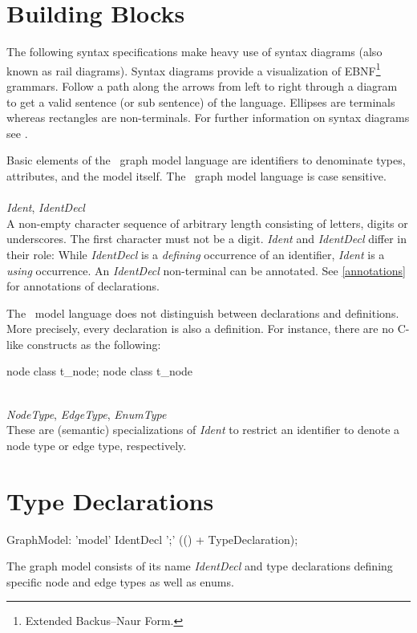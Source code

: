 \section{Building Blocks}
\label{modelbb}

\begin{note}
The following syntax specifications make heavy use of syntax diagrams (also known as rail diagrams). Syntax diagrams provide a visualization of EBNF\footnote{Extended Backus–Naur Form.} grammars. Follow a path along the arrows from left to right through a diagram to get a valid sentence (or sub sentence) of the language. Ellipses are terminals whereas rectangles are non-terminals. For further information on syntax diagrams see \cite{pascal}.
\end{note}
Basic elements of the \GrG\ graph model language are identifiers to denominate types, attributes, and the model itself. The \GrG\ graph model language is case sensitive.\\
\\
\emph{Ident}, \emph{IdentDecl}\\ \nopagebreak
A non-empty character sequence of arbitrary length consisting of letters, digits or underscores. The first character must not be a digit. \emph{Ident} and \emph{IdentDecl} differ in their role: While \emph{IdentDecl} is a \emph{defining} occurrence of an identifier, \emph{Ident} is a \emph{using} occurrence. An \emph{IdentDecl} non-terminal can be annotated. See \ref{annotations} for annotations of declarations.
\begin{note}
  The \GrG\ model language does not distinguish between declarations and definitions. More precisely, every declaration is also a definition. For instance, there are no C-like constructs as the following:
\begin{grgen}
node class t_node;
node class t_node {
}
\end{grgen}
\end{note}
\mbox{ }\\
\emph{NodeType}, \emph{EdgeType}, \emph{EnumType}\\ \nopagebreak
These are (semantic) specializations of \emph{Ident} to restrict an identifier to denote a node type or edge type, respectively.

\section{Type Declarations}
\begin{rail}
  GraphModel: 'model' IdentDecl ';' (() + TypeDeclaration);
\end{rail}
The graph model consists of its name \emph{IdentDecl} and type declarations defining specific node and edge types as well as enums.

